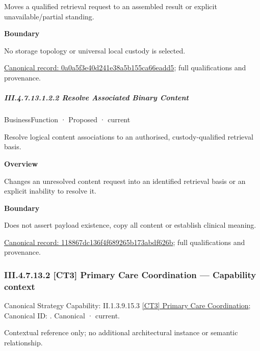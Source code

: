 Moves a qualified retrieval request to an assembled result or explicit unavailable/partial standing.



\textbf{Boundary}



No storage topology or universal local custody is selected.


{\footnotesize \href{../../../../../../../continuum/business/business-function/0a0a5f3e40d241e38a5b155ca66eadd5.md}{Canonical record: 0a0a5f3e40d241e38a5b155ca66eadd5}; full qualifications and provenance.}\par
\subparagraph*{III.4.7.13.1.2.2 Resolve Associated Binary Content}
\label{navigation:III.4.7.13.1.2.2}

\label{element:118867dc136f4f689265b173abdf626b}
{\small BusinessFunction · Proposed · current}\par

Resolve logical content associations to an authorised, custody-qualified retrieval basis.



\textbf{Overview}



Changes an unresolved content request into an identified retrieval basis or an explicit inability to resolve it.



\textbf{Boundary}



Does not assert payload existence, copy all content or establish clinical meaning.


{\footnotesize \href{../../../../../../../continuum/business/business-function/118867dc136f4f689265b173abdf626b.md}{Canonical record: 118867dc136f4f689265b173abdf626b}; full qualifications and provenance.}\par
\subsubsection*{III.4.7.13.2 [CT3] Primary Care Coordination — Capability context}
\label{navigation:III.4.7.13.2}

{\small Canonical Strategy Capability: II.1.3.9.15.3 \hyperref[element:f80e73ee91624ce5baa11ae15480fd35]{[CT3] Primary Care Coordination}; Canonical ID: \texttt{}. Canonical · current.}\par
Contextual reference only; no additional architectural instance or semantic relationship.\par
